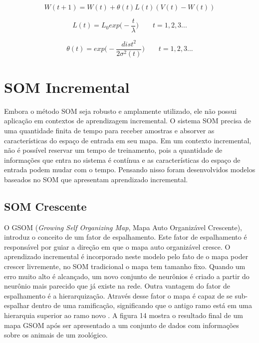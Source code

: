 \begin{equation}
W(t + 1) = W(t) +   \theta (t) L(t) (V(t) - W(t))
\end{equation}


\begin{equation}
L(t) =  L_{0} exp  \big( - \frac{t}{ \lambda } \big) \quad \quad t = 1,2,3...
\end{equation}

\begin{equation} 
\theta (t) = exp  \big(- \frac{ dist^{2} }{2  \sigma^{2}(t) } \big)  \quad \quad t= 1,2,3...
\end{equation}

\section{SOM Incremental}
Embora o método SOM seja robusto e amplamente utilizado, ele não possui aplicação em contextos de aprendizagem incremental. O sistema SOM precisa de uma quantidade finita de tempo para receber amostras e absorver as características do espaço de entrada em seu mapa. Em um contexto incremental, não é possível reservar um tempo de treinamento, pois a quantidade de informações que entra no sistema é contínua e as características do espaço de entrada podem mudar com o tempo. Pensando nisso foram desenvolvidos modelos baseados no SOM que apresentam aprendizado incremental.

\subsection{SOM Crescente}
O GSOM (\textit{Growing Self Organizing Map}, Mapa Auto Organizável Crescente), introduz o conceito de um fator de espalhamento. Este fator de espalhamento é responsável por guiar a direção em que o mapa auto organizável cresce. O aprendizado incremental é incorporado neste modelo pelo fato de o mapa poder crescer livremente, no SOM tradicional o mapa tem tamanho fixo. Quando um erro muito alto é alcançado, um novo conjunto de neurônios é criado a partir do neurônio mais parecido que já existe na rede. Outra vantagem do fator de espalhamento é a hierarquização. Através desse fator o mapa é capaz de se sub-espalhar dentro de uma ramificação, significando que o antigo ramo está em uma hierarquia superior ao ramo novo \cite{gsom2000}. A figura 14 mostra o resultado final de um mapa GSOM após ser apresentado a um conjunto de dados com informações sobre os animais de um zoológico.

